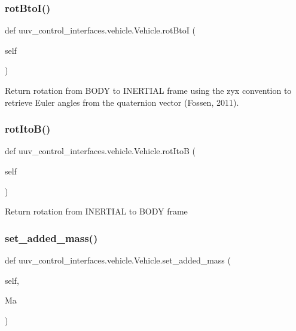 \subsubsection{\texorpdfstring{rot\+Bto\+I()}{rotBtoI()}}
{\footnotesize\ttfamily def uuv\+\_\+control\+\_\+interfaces.\+vehicle.\+Vehicle.\+rot\+BtoI (\begin{DoxyParamCaption}\item[{}]{self }\end{DoxyParamCaption})}

\begin{DoxyVerb}Return rotation from BODY to INERTIAL frame using the zyx convention
   to retrieve Euler angles from the quaternion vector (Fossen, 2011).
\end{DoxyVerb}
 \mbox{\label{classuuv__control__interfaces_1_1vehicle_1_1Vehicle_a44b57f3313e3ded3e7721930b1170b9f}} 
\subsubsection{\texorpdfstring{rot\+Ito\+B()}{rotItoB()}}
{\footnotesize\ttfamily def uuv\+\_\+control\+\_\+interfaces.\+vehicle.\+Vehicle.\+rot\+ItoB (\begin{DoxyParamCaption}\item[{}]{self }\end{DoxyParamCaption})}

\begin{DoxyVerb}Return rotation from INERTIAL to BODY frame\end{DoxyVerb}
 \mbox{\label{classuuv__control__interfaces_1_1vehicle_1_1Vehicle_a6d005052594343c0042293ab46a0907e}} 
\subsubsection{\texorpdfstring{set\+\_\+added\+\_\+mass()}{set\_added\_mass()}}
{\footnotesize\ttfamily def uuv\+\_\+control\+\_\+interfaces.\+vehicle.\+Vehicle.\+set\+\_\+added\+\_\+mass (\begin{DoxyParamCaption}\item[{}]{self,  }\item[{}]{Ma }\end{DoxyParamCaption})}

